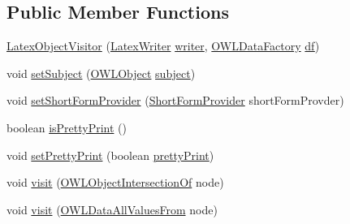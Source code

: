 \subsection*{Public Member Functions}
\begin{DoxyCompactItemize}
\item 
\hyperlink{classorg_1_1coode_1_1owlapi_1_1latex_1_1_latex_object_visitor_a787ba10ffabbca628df1447758135d02}{Latex\-Object\-Visitor} (\hyperlink{classorg_1_1coode_1_1owlapi_1_1latex_1_1_latex_writer}{Latex\-Writer} \hyperlink{classorg_1_1coode_1_1owlapi_1_1latex_1_1_latex_object_visitor_a58d344b81fa2c24bcab5ab55e6353171}{writer}, \hyperlink{interfaceorg_1_1semanticweb_1_1owlapi_1_1model_1_1_o_w_l_data_factory}{O\-W\-L\-Data\-Factory} \hyperlink{classorg_1_1coode_1_1owlapi_1_1latex_1_1_latex_object_visitor_a5cca7b483d51c448cb2e881f6b05deb9}{df})
\item 
void \hyperlink{classorg_1_1coode_1_1owlapi_1_1latex_1_1_latex_object_visitor_a96de1511c5aa924b32d9d74afd683c3b}{set\-Subject} (\hyperlink{interfaceorg_1_1semanticweb_1_1owlapi_1_1model_1_1_o_w_l_object}{O\-W\-L\-Object} \hyperlink{classorg_1_1coode_1_1owlapi_1_1latex_1_1_latex_object_visitor_accd41afa75107ee74bb2f82e8ed02c2b}{subject})
\item 
void \hyperlink{classorg_1_1coode_1_1owlapi_1_1latex_1_1_latex_object_visitor_a189ff436ac5112d7641f40b5687906b0}{set\-Short\-Form\-Provider} (\hyperlink{interfaceorg_1_1semanticweb_1_1owlapi_1_1util_1_1_short_form_provider}{Short\-Form\-Provider} short\-Form\-Provder)
\item 
boolean \hyperlink{classorg_1_1coode_1_1owlapi_1_1latex_1_1_latex_object_visitor_a64657646560255a03a16dcd384dd4aef}{is\-Pretty\-Print} ()
\item 
void \hyperlink{classorg_1_1coode_1_1owlapi_1_1latex_1_1_latex_object_visitor_ae187a5ccf2cd27aee7e6b32ed52e45c5}{set\-Pretty\-Print} (boolean \hyperlink{classorg_1_1coode_1_1owlapi_1_1latex_1_1_latex_object_visitor_a1e6073accdc8c64db38ea81a8a00616f}{pretty\-Print})
\item 
void \hyperlink{classorg_1_1coode_1_1owlapi_1_1latex_1_1_latex_object_visitor_a5326067eb875d106dd6d5793731cd1d5}{visit} (\hyperlink{interfaceorg_1_1semanticweb_1_1owlapi_1_1model_1_1_o_w_l_object_intersection_of}{O\-W\-L\-Object\-Intersection\-Of} node)
\item 
void \hyperlink{classorg_1_1coode_1_1owlapi_1_1latex_1_1_latex_object_visitor_a35dfdb6346415b7b539dad42243e3f0d}{visit} (\hyperlink{interfaceorg_1_1semanticweb_1_1owlapi_1_1model_1_1_o_w_l_data_all_values_from}{O\-W\-L\-Data\-All\-Values\-From} node)

\end{DoxyCompactItemize}
